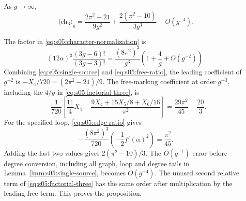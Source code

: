 \begin{prp}\label{prp:s05:third-character}
As $g\to\infty$,
\begin{equation}\label{eq:s05:third-character}
 \langle\mathrm{ch}_3\rangle_g
 =\frac{2\pi^2-21}{9g^2}
       +\frac{2(\pi^2-10)}{3g^3}+O(g^{-4}).
\end{equation}
\end{prp}
\begin{prf}
The factor in \eqref{eq:s05:character-normalization} is
\begin{equation}\label{eq:s05:factorial-three}
 (12\alpha)^3\frac{(3g-6)!}{(3g-3)!}
 =\frac{(8\pi^2)^3}{g^3}
             \left(1+\frac4g+O(g^{-2})\right).
\end{equation}
Combining \eqref{eq:s05:single-source} and
\eqref{eq:s05:free-ratio}, the leading coefficient of $g^{-2}$
is $-X_4/720=(2\pi^2-21)/9$.
The free-marking coefficient at order $g^{-3}$, including the
$4/g$ in \eqref{eq:s05:factorial-three}, is
\begin{equation}\label{eq:s05:free-coefficient}
 -\frac1{720}\left[
 \frac{11}{4}X_4-
 \frac{9X_4+15X_5/8+X_6/16}{\pi^2}\right]
 =\frac{29\pi^2}{45}-\frac{20}{3}.
\end{equation}
For the specified loop, \eqref{eq:s05:edge-ratio} gives
\begin{equation}\label{eq:s05:loop-coefficient}
 -\frac{(8\pi^2)^3}{720}
           \left(-\frac12f'(\alpha)^2\right)=\frac{\pi^2}{45}.
\end{equation}
Adding the last two values gives $2(\pi^2-10)/3$.
The $O(g^{-1})$ error before degree conversion, including all graph,
loop and degree tails in Lemma~\ref{lmm:s05:single-source}, becomes
$O(g^{-4})$. The unused second relative term of
\eqref{eq:s05:factorial-three} has the same order after multiplication
by the leading free term. This proves the proposition.
\end{prf}
